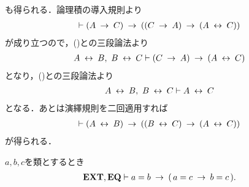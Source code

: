 \begin{sketch}
		も得られる．論理積の導入規則より
		\begin{align}
			\vdash (A \rarrow C) \rarrow ((C \rarrow A) \rarrow (A \lrarrow C))
		\end{align}
		が成り立つので，()との三段論法より
		\begin{align}
			A \lrarrow B,\ B \lrarrow C \vdash (C \rarrow A) \rarrow (A \lrarrow C)
		\end{align}
		となり，()との三段論法より
		\begin{align}
			A \lrarrow B,\ B \lrarrow C \vdash A \lrarrow C
		\end{align}
		となる．あとは演繹規則を二回適用すれば
		\begin{align}
			\vdash (A \lrarrow B) \rarrow ((B \lrarrow C) \rarrow (A \lrarrow C))
		\end{align}
		が得られる．
		\QED
	\end{sketch}
	
	\begin{screen}
		\begin{thm}[等号の推移律]\label{thm:transitive_law_of_equality}
			$a,b,c$を類とするとき
			\begin{align}
				\EXTAX,\EQAX \vdash a = b \rarrow (\, a = c \rarrow b = c\, ).
			\end{align}
		\end{thm}
	\end{screen}
	
